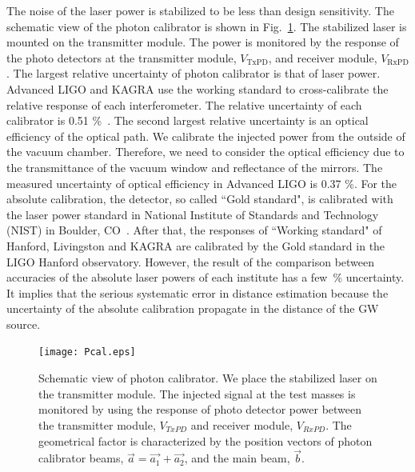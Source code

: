 \documentclass[%
 reprint,
superscriptaddress,
 amsmath,amssymb,
 aps,
]{revtex4-1}
\begin{document}
The noise of the laser power is stabilized to be less than design sensitivity. The schematic view of the photon calibrator is shown in Fig.~\ref{fig:Pcal}. The stabilized laser is mounted on the transmitter module. The power is monitored by the response of the photo detectors at the transmitter module, $V_{\mathrm{TxPD}}$, and receiver module, $V_{\mathrm{RxPD}}$.  
The largest relative uncertainty of photon calibrator is that of laser power.
Advanced LIGO and KAGRA use the working standard to cross-calibrate the relative response of each interferometer. The relative uncertainty of  each  calibrator is 0.51 \%~\cite{doi:10.1063/1.4967303}. 
The second largest relative uncertainty is an optical efficiency of the optical path. We calibrate the injected power from the outside of the vacuum chamber. Therefore, we need to consider the optical efficiency due to the transmittance of the vacuum window and reflectance of the mirrors. The measured uncertainty of optical efficiency in Advanced LIGO is 0.37 \%. 
For the absolute calibration, the detector, so called ``Gold standard", is calibrated with the laser power standard in National Institute of Standards and Technology (NIST) in Boulder, CO~\cite{taylor:1994:GEEU}. 
 After that, the responses of ``Working standard" of Hanford, Livingston and KAGRA are calibrated by the Gold standard in the LIGO Hanford observatory. 
However, the result of the comparison between accuracies of the absolute laser powers of each institute has a few~\% uncertainty. It implies that the serious systematic error in distance estimation because the uncertainty of the absolute calibration propagate in the distance of the GW source.

\begin{figure}
\begin{center}
\texttt{[image: Pcal.eps]}
\caption{Schematic view of photon calibrator. We place the stabilized laser on the transmitter module. The injected signal at the test masses is monitored by using the response of photo detector power between the transmitter module, $V_{TxPD}$ and  receiver module, $V_{RxPD}$.  The geometrical factor is characterized by the position vectors of photon calibrator beams, $\vec{a}=\vec{a_1}+\vec{a_2}$, and the main beam, $\vec{b}$.}
\label{fig:Pcal}
\end{center}
\end{figure}
\end{document}
